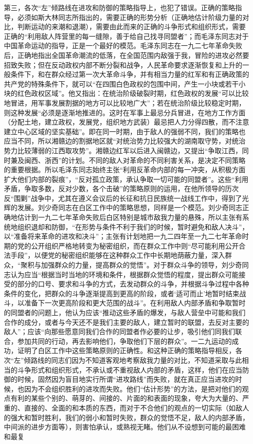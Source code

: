 第三，各次“左”倾路线在进攻和防御的策略指导上，也犯了错误。正确的策略指导，必须如斯大林同志所指出的，需要正确的形势分析（正确地估计阶级力量的对比，判断运动的来潮和退潮），需要由此而来的正确的斗争形式和组织形式，需要正确的“利用敌人阵营里的每一缝隙，善于给自己找寻同盟者”；而毛泽东同志对于中国革命运动的指导，正是一个最好的模范。毛泽东同志在一九二七年革命失败后，正确地指出全国革命潮流的低落，在全国范围内敌强于我，冒险的进攻必然要招致失败；但在反动政权内部不断分裂和战争，人民革命要求逐渐恢复和上升的一般条件下，和在群众经过第一次大革命斗争，并有相当力量的红军和有正确政策的共产党的特殊条件下，就可以“在四围白色政权的包围中间，产生一小块或若干小块的红色政权区域”。他又指出：在统治阶级破裂时期，红色政权的发展“可以比较地冒进，用军事发展割据的地方可以比较地广大”；若在统治阶级比较稳定时期，则这种发展“必须是逐渐地推进的。这时在军事上最忌分兵冒进，在地方工作方面（分配土地，建立政权，发展党，组织地方武装）最忌把人力分得四散，而不注意建立中心区域的坚实基础”。即在同一时期，由于敌人的强弱不同，我们的策略也应当不同，所以湘赣边的割据地区就“对统治势力比较强大的湖南取守势，对统治势力比较薄弱的江西取攻势”。湘赣边红军以后进入闽赣边，又提出“争取江西，同时兼及闽西、浙西”的计划。不同的敌人对革命的不同利害关系，是决定不同策略的重要根据。所以毛泽东同志始终主张“利用反革命内部的每一冲突，从积极方面扩大他们内部的裂痕”，“反对孤立政策，承认争取一切可能的同盟者”。这些“利用矛盾，争取多数，反对少数，各个击破”的策略原则的运用，在他所领导的历次反“围剿”战争中，尤其在遵义会议后的长征和抗日民族统一战线工作中，得到了光辉的发展。刘少奇同志在白区工作中的策略思想，同样是一个模范。刘少奇同志正确地估计到一九二七年革命失败后白区特别是城市敌我力量的悬殊，所以主张有系统地组织退却和防御，“在形势与条件不利于我们的时候，暂时避免和敌人决斗”，以“准备将来革命的进攻和决斗”；主张有计划地把一九二四年至一九二七年革命时期的党的公开组织严格地转变为秘密组织，而在群众工作中则“尽可能利用公开合法手段”，以便党的秘密组织能够在这种群众工作中长期地荫蔽力量，深入群众，“聚积与加强群众的力量，提高群众的觉悟”。对于群众斗争的领导，刘少奇同志认为应当“根据当时当地的环境和条件，根据群众觉悟的程度，提出群众可能接受的部分的口号、要求和斗争的方式，去发动群众的斗争，并根据斗争过程中各种条件的变化，把群众的斗争逐渐提高到更高的阶段，或者‘适可而止’地暂时结束战斗，以准备下一次更高阶段和更大范围的战斗”。在利用敌人内部矛盾和争取暂时的同盟者的问题上，他认为应该“推动这些矛盾的爆发，与敌人营垒中可能和我们合作的成分，或者与今天还不是我们主要的敌人，建立暂时的联盟，去反对主要的敌人”；应该“向那些愿意同我们合作的同盟者作必要的让步，吸引他们同我们联合，参加共同的行动，再去影响他们，争取他们下层的群众”。一二九运动的成功，证明了白区工作中这些策略原则的正确性。和这种正确的策略指导相反，各次“左”倾路线的同志们因为不知道客观地考察敌我力量的对比，不知道采取与此相当的斗争形式和组织形式，不承认或不重视敌人内部的矛盾，这样，他们在应当防御的时候，固然因为盲目地实行所谓“进攻路线”而失败，就在真正应当进攻的时候，也因为不会组织胜利的进攻而失败。他们“估计形势”的方法，是把对他们的观点有利的某些个别的、萌芽的、间接的、片面的和表面的现象，夸大为大量的、严重的、直接的、全面的和本质的东西，而对于不合他们的观点的一切实际（如敌人的强大和暂时胜利，我们的弱小和暂时失败，群众的觉悟不足，敌人的内部矛盾，中间派的进步方面等），则害怕承认，或熟视无睹。他们从不设想到可能的最困难和最复